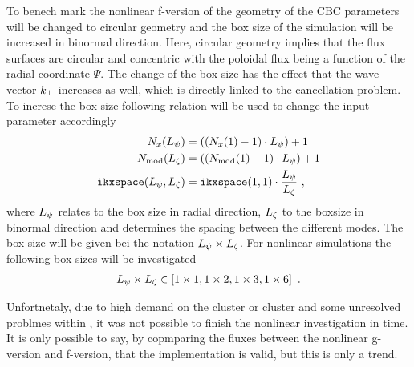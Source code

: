 To benech mark the nonlinear f-version of {\gkw} the geometry of the CBC parameters will be changed to circular geometry and the box size of the simulation will be increased in binormal direction. Here, circular geometry implies that the flux surfaces are circular and concentric with the poloidal flux being a function of the radial coordinate $\Psi$. \cite{GKWManual} The change of the box size has the effect that the wave vector $k_\perp$ increases as well, which is directly linked to the cancellation problem. To increse the box size following relation will be used to change the input parameter accordingly
\begin{gather}
    \begin{aligned}
        N_x(L_\psi) &= ((N_x(1) - 1) \cdot L_\psi) + 1 \\
        N_\mathrm{mod}(L_\zeta) &= ((N_\mathrm{mod}(1) - 1) \cdot L_\psi) + 1 \\
        \mathtt{ikxspace}(L_\psi,L_\zeta) &= \mathtt{ikxspace}(1,1) \cdot \frac{L_\psi}{L_\zeta}~,
    \end{aligned}
    \label{eq:boxsize}
\end{gather}
where $L_\psi$ relates to the box size in radial direction, $L_\zeta$ to the boxsize in binormal direction and  determines the spacing between the different modes. The box size will be given bei the notation $L_\psi \times L_\zeta$. For nonlinear simulations the following box sizes will be investigated
\begin{gather*}
    L_\psi \times L_\zeta \in \left[ 1\times 1, 1 \times 2, 1\times 3, 1 \times 6\right] ~.
\end{gather*}

Unfortnetaly, due to high demand on the  cluster or  cluster and some unresolved problmes within {\gkw}, it was not possible to finish the nonlinear investigation in time. It is only possible to say, by copmparing the fluxes between the nonlinear g-version and f-version, that the implementation is valid, but this is only a trend. 